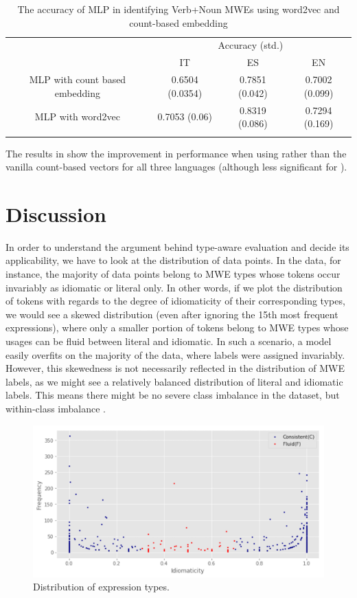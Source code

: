 \documentclass[output=paper
,modfonts
,nonflat]{langsci/langscibook}
\begin{document}
\begin{table}[!ht]
\small
\caption{The accuracy of MLP in identifying Verb+Noun MWEs using word2vec and count-based embedding}
\label{tab:wv}
 \begin{tabular}{cccc}
  \lsptoprule
  & \multicolumn{3}{c}{Accuracy (std.)} \\
  & IT & ES & EN \\
  \midrule
  MLP with count based embedding & 0.6504 (0.0354) & 0.7851 (0.042)  & 0.7002 (0.099) \\
  MLP with word2vec & 0.7053 (0.06) &   0.8319 (0.086) & 0.7294 (0.169) \\
  \lspbottomrule
 \end{tabular}
\end{table}

The results in  show the improvement in performance when using  rather than the vanilla count-based vectors for all three languages (although less significant for ). 
 
\section{Discussion}

In order to understand the argument behind type-aware evaluation and decide its applicability, we have to look at the distribution of data points. In the  data, for instance, the majority of data points belong to MWE types whose tokens occur invariably as idiomatic or literal only. In other words, if we plot the distribution of tokens with regards to the degree of idiomaticity of their corresponding types, we would see a skewed distribution (even after ignoring the 15th most frequent expressions), where only a smaller portion of tokens belong to MWE types whose usages can be fluid between literal and idiomatic. In such a scenario, a model easily overfits on the majority of the data, where labels were assigned invariably. However, this skewedness is not necessarily reflected in the distribution of MWE labels, as we might see a relatively balanced distribution of literal and idiomatic labels. This means there might be no severe class imbalance in the dataset, but within-class imbalance \citep{ali2015classification}.

\begin{figure}[!htb]
\includegraphics[scale=0.45]{figures/data_imbalance.png} 
\caption{Distribution of expression types.}
\label{fig:data}
\end{figure}
\end{document}
